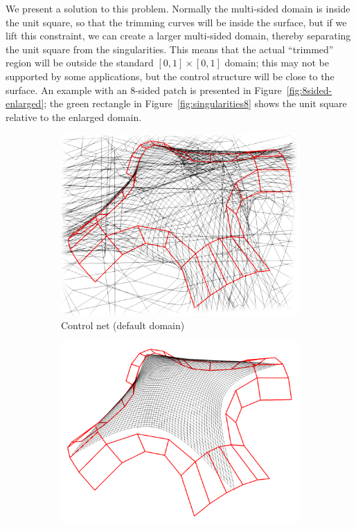 \documentclass[9pt,academicons]{article}
\begin{document}
We present a solution to this problem. Normally the multi-sided domain is inside the unit
square, so that the trimming curves will be inside the
surface, but if we lift this constraint, we can create a larger multi-sided domain,
thereby separating the unit square from the singularities. This means that the actual ``trimmed''
region will be outside the standard $[0,1]\times[0,1]$ domain; this may not be supported by some
applications, but the control structure will be close to the surface.
An example with an 8-sided patch is presented in Figure~\ref{fig:8sided-enlarged};
the green rectangle in Figure~\ref{fig:singularities8} shows
the unit square relative to the enlarged domain.
\begin{figure}
  \begin{subfigure}{.3\textwidth}
    \centering
    \includegraphics[width=\textwidth]{images/8sided-1.png}
    \caption{Control net (default domain)}
    \label{fig:8sided-default}
  \end{subfigure}
  \hfill
  \begin{subfigure}{.3\textwidth}
    \centering
    \includegraphics[width=\textwidth]{images/8sided-2.png}

\end{subfigure}
\end{figure}
\end{document}
